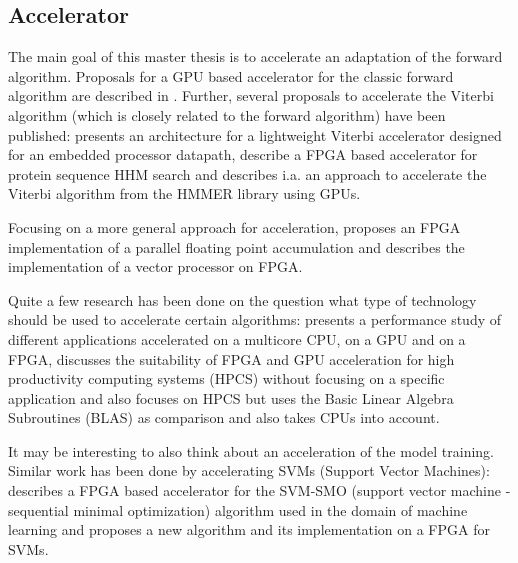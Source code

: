 \documentclass[12pt]{article} %
\begin{document}

\subsection{Accelerator} %

The main goal of this master thesis is to accelerate an adaptation of the
forward algorithm. Proposals for a GPU based accelerator for the classic
forward algorithm are described in \cite{neumann11,liu09}. Further, several
proposals to accelerate the Viterbi algorithm (which is closely related to the
forward algorithm) have been published: \cite{ASAP12_Azhar} presents an
architecture for a lightweight Viterbi accelerator designed for an embedded
processor datapath, \cite{IPDPS07_Jacob,ICS06_Maddimsetty,IPDPS07_Oliver}
describe a FPGA based accelerator for protein sequence HHM search and
\cite{IPDPS09_Walters} describes i.a. an approach to accelerate the Viterbi
algorithm from the HMMER library using GPUs.

Focusing on a more general approach for acceleration, \cite{ARITH13_Kadric}
proposes an FPGA implementation of a parallel floating point accumulation and
\cite{ITNG07_Hongyan} describes the implementation of a vector processor on
FPGA.

Quite a few research has been done on the question what type of technology
should be used to accelerate certain algorithms: \cite{SASP08_Che} presents
a performance study of different applications accelerated on a multicore CPU,
on a GPU and on a FPGA, \cite{FPL10_Jones} discusses the suitability of FPGA
and GPU acceleration for high productivity computing systems (HPCS) without
focusing on a specific application and \cite{ISVLSI10_Kestur} also focuses on
HPCS but uses the Basic Linear Algebra Subroutines (BLAS) as comparison and
also takes CPUs into account.

It may be interesting to also think about an acceleration of the model
training. Similar work has been done by accelerating SVMs (Support Vector Machines):
\cite{FCCM09_Cadambi} describes a FPGA based accelerator for the SVM-SMO
(support vector machine - sequential minimal optimization) algorithm used in
the domain of machine learning and \cite{IEEE03_Anguita} proposes a new algorithm
and its implementation on a FPGA for SVMs.

\end{document}
